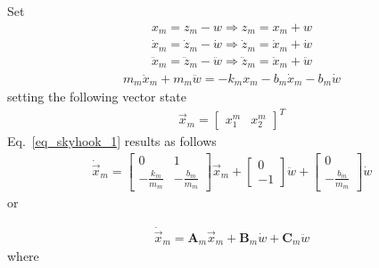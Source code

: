 \documentclass[12pt,a4paper,oneside]{book}
\begin{document}
\begin{onehalfspace}
Set
\begin{equation*}
	\begin{aligned}
		x_m=z_m-w \Rightarrow z_m=x_m+w\\[6pt]
		\dot{x}_m=\dot{z}_m-\dot{w} \Rightarrow \dot{z}_m=\dot{x}_m+\dot{w} \\[6pt]
		\ddot{x}_m=\ddot{z}_m-\ddot{w} \Rightarrow \ddot{z}_m=\ddot{x}_m+\ddot{w}
	\end{aligned}
\end{equation*} 
\begin{equation}\label{eq_skyhook_1}
	\begin{aligned}
		m_m\ddot{x}_m + m_m\ddot{w}= -k_m x_m-b_m\dot{x}_m - b_m\dot{w}
	\end{aligned}
\end{equation} 
setting the following vector state
\begin{equation}
	\begin{aligned}
		\vec{x}_m = \begin{bmatrix} x_1^m & x_2^m \end{bmatrix}^T
	\end{aligned}
\end{equation} 
Eq.~\ref{eq_skyhook_1} results as follows
\begin{equation}
	\begin{aligned}
		\dot{\vec{x}}_m = \begin{bmatrix} 0 & 1 \\[6pt] -\frac{k_m}{m_m} & -\frac{b_m}{m_m} \end{bmatrix}{\vec{x}}_m+\begin{bmatrix} 0 \\[6pt] -1 \end{bmatrix}\ddot{w} + \begin{bmatrix} 0 \\[6pt] -\frac{b_m}{m_m} \end{bmatrix}\dot{w}
	\end{aligned}
\end{equation} 
or
\begin{mybox}
	\begin{equation}\label{eq_skyhook_2}
		\begin{aligned}
			\dot{\vec{x}}_m = \mathbf{A}_m{\vec{x}}_m + \mathbf{B}_m\dot{w} + \mathbf{C}_m\ddot{w} 
		\end{aligned}
	\end{equation} 
	where
	\begin{equation}\label{eq_skyhook_3}
		\begin{aligned}

\end{aligned}
\end{equation}
\end{mybox}
\end{onehalfspace}
\end{document}
